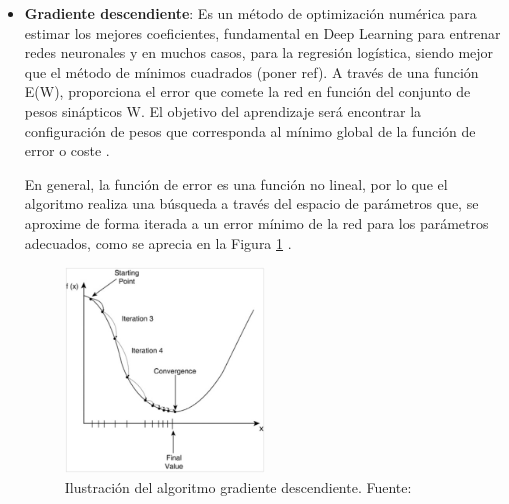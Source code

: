 \begin{itemize}
\begin{itemize}
\begin{itemize}
			\item \textbf{Gradiente descendiente}: Es un método de optimización numérica para estimar los mejores coeficientes, fundamental en Deep Learning para entrenar redes neuronales y en muchos casos, para la regresión logística, siendo mejor que el método de mínimos cuadrados (poner ref). A través de una función E(W), proporciona el error que comete la red en función del conjunto de pesos sinápticos W. El objetivo del aprendizaje será encontrar la configuración de pesos que corresponda al mínimo global de la función de error o coste \parencite{tec_bertona2005algevol}.
			
			En general, la función de error es una función no lineal, por lo que el algoritmo realiza una búsqueda a través del espacio de parámetros que, se aproxime de forma iterada a un error mínimo de la red para los parámetros adecuados, como se aprecia en la Figura \ref{2:fig14} \parencite{tec_sancho2017descentgrad}.
			\begin{figure}[h]
				\begin{center}
					\includegraphics[width=0.5\textwidth]{2/figures/gradiente_descendiente.jpg}
					\caption{Ilustración del algoritmo gradiente descendiente. Fuente: \cite{tec_sancho2017descentgrad}}
					\label{2:fig14}
				\end{center}
			\end{figure}
			

\end{itemize}
\end{itemize}
\end{itemize}
